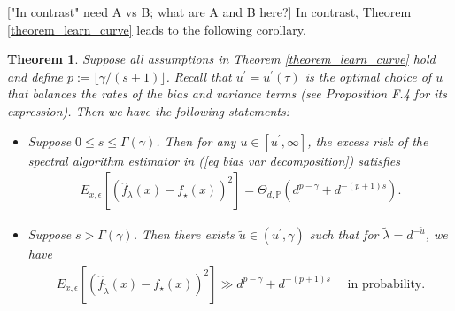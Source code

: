\documentclass{article}
\theoremstyle{plain}
\newtheorem{theorem}{Theorem}[section]
\theoremstyle{definition}
\theoremstyle{remark}
\newcommand{\dhnote}[1]{{\color{red}[#1]} } %
\begin{document}
\dhnote{"In contrast" need A vs B; what are A and B here?}
In contrast, Theorem \ref{theorem_learn_curve} leads to the following corollary.
\fi 


\begin{theorem}\label{coroll_benign_overfit}
    Suppose all assumptions in Theorem \ref{theorem_learn_curve} hold and define \(p := \lfloor \gamma/(s+1) \rfloor\). 
    Recall that $u^{\prime} = u^{\prime}(\tau)$ is the optimal choice of $u$ that balances the rates of the bias and variance terms (see Proposition F.4 for its expression). 
    Then we have the following statements:
    
    \begin{itemize}
        \item[(i)] Suppose $0 \leq s \leq \Gamma(\gamma)$. Then for any $u \in [u^{\prime}, \infty]$, the excess risk of the spectral algorithm estimator in (\ref{eq bias var decomposition}) satisfies
\begin{equation*}
\begin{aligned}
    E_{x, \epsilon} \left[ \left(\hat{f}_{\lambda}(x) - f_{\star}(x) \right)^{2} \right]
= \Theta_{d, \mathbb{P}} \left( 
d^{p-\gamma} + 
    d^{-(p+1)s}
\right).
\end{aligned}
\end{equation*}

\item[(ii)] Suppose $s > \Gamma(\gamma)$. Then there exists $\tilde{u} \in (u^{\prime}, \gamma)$ such that for $\tilde{\lambda}=d^{-\tilde{u}}$, we have
\begin{equation*}
\begin{aligned}
    E_{x, \epsilon} \left[ \left(\hat{f}_{\tilde{\lambda}}(x) - f_{\star}(x) \right)^{2} \right]
 \gg  
d^{p-\gamma} + 
    d^{-(p+1)s} \quad \text{ in probability.}
\end{aligned}
\end{equation*}

    \end{itemize}
\end{theorem}

\end{document}
